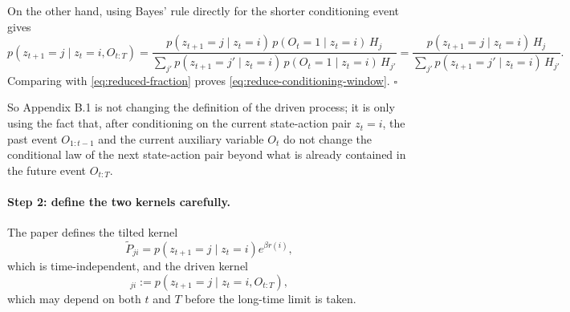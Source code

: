 \documentclass[11pt]{article}
\begin{document}
On the other hand, using Bayes' rule directly for the shorter conditioning event gives
\begin{equation}
    p(z_{t+1}=j\mid z_t=i,O_{t:T})
    =
    \frac{
        p(z_{t+1}=j\mid z_t=i)\,
        p(O_t=1\mid z_t=i)\,
        H_j
    }{
        \sum_{j'} p(z_{t+1}=j'\mid z_t=i)\,
        p(O_t=1\mid z_t=i)\,
        H_{j'}
    }
    =
    \frac{
        p(z_{t+1}=j\mid z_t=i)\,H_j
    }{
        \sum_{j'} p(z_{t+1}=j'\mid z_t=i)\,H_{j'}
    }.
\end{equation}
Comparing with \eqref{eq:reduced-fraction} proves \eqref{eq:reduce-conditioning-window}.
\hfill\(\square\)

So Appendix B.1 is not changing the definition of the driven process; it is only using the
fact that, after conditioning on the current state-action pair \(z_t=i\), the past event
\(O_{1:t-1}\) and the current auxiliary variable \(O_t\) do not change the conditional law of
the next state-action pair beyond what is already contained in the future event \(O_{t:T}\).

\paragraph{Step 2: define the two kernels carefully.}
The paper defines the tilted kernel
\begin{equation}
    \widetilde{P}_{ji}
    =
    p(z_{t+1}=j\mid z_t=i)e^{\beta r(i)},
\end{equation}
which is time-independent, and the driven kernel
\begin{equation}
    [P_d^{(t,T)}]_{ji}
    :=
    p(z_{t+1}=j\mid z_t=i, O_{t:T}),
\end{equation}
which may depend on both \(t\) and \(T\) before the long-time limit is taken.
\end{document}
